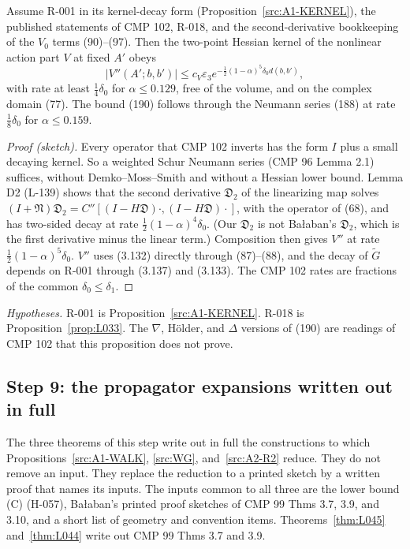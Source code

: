 \begin{proposition}\label{src:A4-D189}
Assume R-001 in its kernel-decay form (Proposition~\ref{src:A1-KERNEL}), the published statements of CMP 102, R-018, and the second-derivative bookkeeping of the $V_0$ terms (90)--(97). Then the two-point Hessian kernel of the nonlinear action part $V$ at fixed $A'$ obeys
\[
|V''(A';b,b')|\le c_V\varepsilon_3e^{-\frac12(1-\alpha)^5\delta_0d(b,b')},
\]
with rate at least $\tfrac14\delta_0$ for $\alpha\le0.129$, free of the volume, and on the complex domain (77). The bound (190) follows through the Neumann series (188) at rate $\tfrac18\delta_0$ for $\alpha\le0.159$.
\end{proposition}
\begin{proof}[Proof (sketch)]
Every operator that CMP 102 inverts has the form $I$ plus a small decaying kernel. So a weighted Schur Neumann series (CMP 96 Lemma 2.1) suffices, without Demko--Moss--Smith and without a Hessian lower bound. Lemma D2 (L-139) shows that the second derivative $\mathfrak D_2$ of the linearizing map solves $(I+\mathfrak N)\mathfrak D_2=C''[(I-H\mathfrak D)\cdot,(I-H\mathfrak D)\cdot]$, with the operator of (68), and has two-sided decay at rate $\tfrac12(1-\alpha)^4\delta_0$. (Our $\mathfrak D_2$ is not Ba{\l}aban's $\mathfrak D_2$, which is the first derivative minus the linear term.) Composition then gives $V''$ at rate $\tfrac12(1-\alpha)^5\delta_0$. $V''$ uses (3.132) directly through (87)--(88), and the decay of $\tilde G$ depends on R-001 through (3.137) and (3.133). The CMP 102 rates are fractions of the common $\delta_0\le\delta_1$.
\end{proof}
\emph{Hypotheses.} R-001 is Proposition~\ref{src:A1-KERNEL}. R-018 is Proposition~\ref{prop:L033}. The $\nabla$, H\"older, and $\Delta$ versions of (190) are readings of CMP 102 that this proposition does not prove.

\subsection{Step 9: the propagator expansions written out in full}\label{sec:src-full}

The three theorems of this step write out in full the constructions to which Propositions~\ref{src:A1-WALK}, \ref{src:WG}, and~\ref{src:A2-R2} reduce. They do not remove an input. They replace the reduction to a printed sketch by a written proof that names its inputs. The inputs common to all three are the lower bound (C) (H-057), Ba{\l}aban's printed proof sketches of CMP 99 Thms 3.7, 3.9, and 3.10, and a short list of geometry and convention items. Theorems~\ref{thm:L045} and~\ref{thm:L044} write out CMP 99 Thms 3.7 and 3.9.

